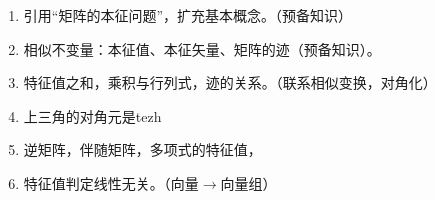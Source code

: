

\begin{issues}
\issueDraft
\begin{enumerate}
\item 引用“矩阵的本征问题”，扩充基本概念。（预备知识）
\item 相似不变量：本征值、本征矢量、矩阵的迹（预备知识）。
\item 特征值之和，乘积与行列式，迹的关系。（联系相似变换，对角化）
\item 上三角的对角元是tezh
\item 逆矩阵，伴随矩阵，多项式的特征值，
\item 特征值判定线性无关。（向量$\rightarrow$向量组）
\end{enumerate}
\end{issues}

